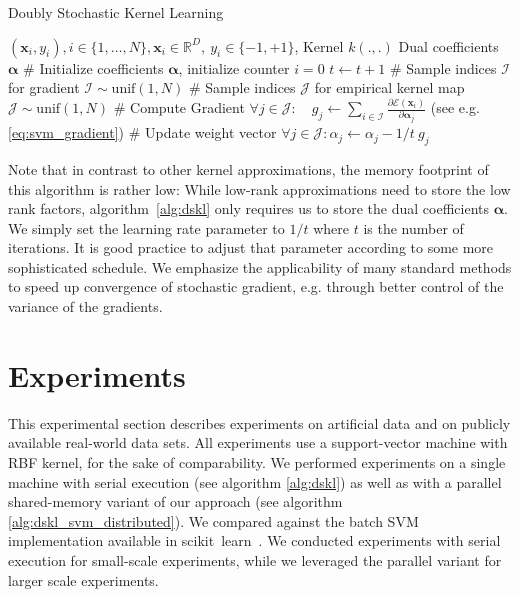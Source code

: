 \documentclass{article} %
\newcommand{\R}{\ensuremath{\mathds{R}}}
\newcommand{\va}{\boldsymbol{\alpha}}
\newcommand{\Bx}{\mathbf{x}}
\renewcommand{\vec}[1]{\mathbf{#1}}
\begin{document}
% 
\begin{algorithm}
  \begin{algorithmic}
    \caption{Doubly Stochastic Kernel Learning\label{alg:dskl}}
     \REQUIRE $(\Bx_i,y_i),i\in\{1,\dots,N\},\Bx_i\in\R^{D},~y_i\in\{-1,+1\}$, Kernel $k(.,.)$
    \ENSURE Dual coefficients $\va$ 
   \STATE \# Initialize coefficients $\va$, initialize counter $i=0$
   \STATE $t\gets t+1$
   \STATE \# Sample indices $\mathcal{I}$ for gradient 
   \STATE $\mathcal{I}\sim\text{unif}(1,N)$
   \STATE \# Sample indices $\mathcal{J}$ for empirical kernel map
   \STATE $\mathcal{J}\sim\text{unif}(1,N)$
   \STATE \# Compute Gradient
   \STATE $\forall j \in \mathcal{J}: \quad g_{j} \gets \sum_{i\in\mathcal{I}}\frac{\partial \mathcal{E}(\vec{x}_i)}{\partial\va_{j}}$  (see e.g. \autoref{eq:svm_gradient})
   \STATE \# Update weight vector 
   \STATE $\forall j\in\mathcal{J}: \alpha_j\gets\alpha_j - 1/t~ g_j$ 
   \ENDWHILE
  \end{algorithmic}
\end{algorithm}
%
Note that in contrast to other kernel approximations, the memory footprint of this algorithm is rather low: While low-rank approximations need to store the low rank factors, algorithm~\autoref{alg:dskl} only requires us to store the dual coefficients $\va$. We simply set the learning rate parameter to $1/t$ where $t$ is the number of iterations. It is good practice to adjust that parameter according to some more sophisticated schedule. We emphasize the applicability of many standard methods to speed up convergence of stochastic gradient, e.g. through better control of the variance of the gradients.
%
\section{Experiments}\label{sec:experiments}
This experimental section describes experiments on artificial data and on publicly available real-world data sets. All experiments use a support-vector machine with RBF kernel, for the sake of comparability. We performed experiments on a single machine with serial execution (see algorithm \autoref{alg:dskl}) as well as with a parallel shared-memory variant of our approach (see algorithm \autoref{alg:dskl_svm_distributed}). We compared against the batch SVM implementation available in scikit~learn~\cite{sklearn_api}. We conducted experiments with serial execution for small-scale experiments, while we leveraged the parallel variant for larger scale experiments. 
\end{document}
